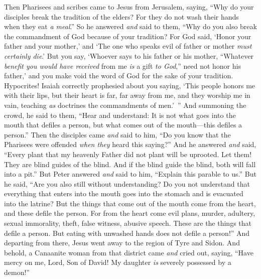 \begin{biblechapter} %
 Then Pharisees and scribes came to Jesus from Jerusalem, saying,
\verse “Why do your disciples break the tradition of the elders? For they do not wash their hands when they eat \textit{a meal}.”
\verse So he answered \textit{and} said to them, “Why do you also break the commandment of God because of your tradition?
\verse For God said, ‘Honor your father and your mother,’ and ‘The one who speaks evil of father or mother \textit{must certainly die}.’
\verse But you say, ‘Whoever says to his father or his mother, “Whatever \textit{benefit you would have received} from me \textit{is} a gift \textit{to God},”
\verse need not honor his father,’ and you make void the word of God for the sake of your tradition.
\verse Hypocrites! Isaiah correctly prophesied about you saying,
\verse ‘This people honors me with their lips, 
but their heart is far, far away from me,
\verse and they worship me in vain, 
teaching \textit{as} doctrines the commandments of men.’ ”
 And summoning the crowd, he said to them, “Hear and understand:
\verse It is not what goes into the mouth that defiles a person, but what comes out of the mouth—this defiles a person.”
\verse Then the disciples came \textit{and} said to him, “Do you know that the Pharisees were offended \textit{when they} heard this saying?”
\verse And he answered \textit{and} said, “Every plant that my heavenly Father did not plant will be uprooted.
\verse Let them! They are blind guides of the blind. And if the blind guide the blind, both will fall into a pit.”
\verse But Peter answered \textit{and} said to him, “Explain this parable to us.”
\verse But he said, “Are you also still without understanding?
\verse Do you not understand that everything that enters into the mouth goes into the stomach and is evacuated into the latrine?
\verse But the things that come out of the mouth come from the heart, and these defile the person.
\verse For from the heart come evil plans, murder, adultery, sexual immorality, theft, false witness, abusive speech.
\verse These are the things that defile a person. But eating with unwashed hands does not defile a person!”
 And departing from there, Jesus went away to the region of Tyre and Sidon.
\verse And behold, a Canaanite woman from that district came \textit{and} cried out, saying, “Have mercy on me, Lord, Son of David! My daughter \textit{is} severely possessed by a demon!”

\end{biblechapter}
